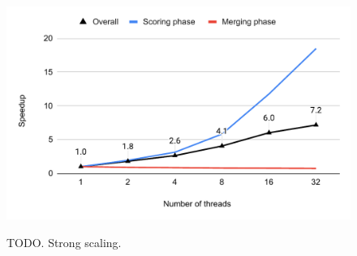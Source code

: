 \begin{figure}[hbtp]
  \centering
  \includegraphics[width=0.98\linewidth]{out/strong-scaling-speedup.pdf} \\[-2ex]
  \caption{TODO. Strong scaling.}
  \label{fig:strong-scaling}
\end{figure}
